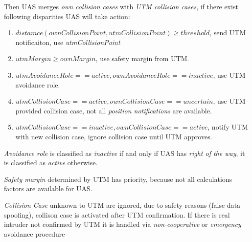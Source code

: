     Then UAS merges \emph{own collision cases} with \emph{UTM collision cases}, if there exist following disparities UAS will take action:
    \begin{enumerate}
        \item $distamce(ownCollisionPoint,utmCollisionPoint)\ge threshold$, send UTM notificaiton, use \emph{utmCollisionPoint}
        \item $utmMargin \ge ownMargin$, use safety margin from UTM.
        \item $utmAvoidanceRole == active, ownAvoidanceRole == inactive$, use UTM avoidance role.
        \item $utmCollisionCase == active, ownCollisionCase == uncertain$, use UTM provided collision case, not all \emph{position notifications} are available. 
        \item $utmCollisionCase == inactive, ownCollisionCase == active$, notify UTM with new collision case, ignore collision case until UTM approves.
    \end{enumerate}
    \begin{note}
        \emph{Avoidance role} is classified as \emph{inactive} if and only if UAS has \emph{right of the way}, it is classified as \emph{active} otherwise.
        
        \emph{Safety margin} determined by UTM has priority, because not all calculations factors are available for UAS.
        
        \emph{Collision Case} unknown to UTM are ignored, due to safety reasons (false data spoofing), collison case is activated after UTM confirmation. If there is real intruder not confirmed by UTM it is handled via \emph{non-cooperative} or \emph{emergency} avoidance procedure
    \end{note}
    
